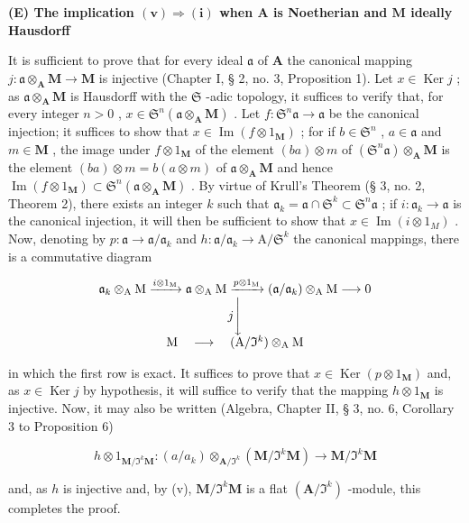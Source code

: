 \textbf{(E) The implication \((\mathbf{v})\Rightarrow (\mathbf{i})\) when \(\mathbf{A}\) is Noetherian and \(\mathbf{M}\) ideally Hausdorff}\par

It is sufficient to prove that for every ideal \(\mathfrak{a}\) of \(\mathbf{A}\) the canonical mapping \(j\colon \mathfrak{a} \otimes_{\mathbf{A}} \mathbf{M} \to \mathbf{M}\) is injective (Chapter I, § 2, no. 3, Proposition 1). Let \(x \in \operatorname{Ker} j\) ; as \(\mathfrak{a} \otimes_{\mathbf{A}} \mathbf{M}\) is Hausdorff with the \(\mathfrak{S}\) -adic topology, it suffices to verify that, for every integer \(n > 0\) , \(x \in \mathfrak{S}^n(\mathfrak{a} \otimes_{\mathbf{A}} \mathbf{M})\) . Let \(f\colon \mathfrak{S}^n\mathfrak{a} \to \mathfrak{a}\) be the canonical injection; it suffices to show that \(x \in \operatorname{Im}(f \otimes 1_{\mathbf{M}})\) ; for if \(b \in \mathfrak{S}^n\) , \(a \in \mathfrak{a}\) and \(m \in \mathbf{M}\) , the image under \(f \otimes 1_{\mathbf{M}}\) of the element \((ba) \otimes m\) of \((\mathfrak{S}^n\mathfrak{a}) \otimes_{\mathbf{A}} \mathbf{M}\) is the element \((ba) \otimes m = b(a \otimes m)\) of \(\mathfrak{a} \otimes_{\mathbf{A}} \mathbf{M}\) and hence \(\operatorname{Im}(f \otimes 1_{\mathbf{M}}) \subset \mathfrak{S}^n(\mathfrak{a} \otimes_{\mathbf{A}} \mathbf{M})\) . By virtue of Krull's Theorem (§ 3, no. 2, Theorem 2), there exists an integer \(k\) such that \(\mathfrak{a}_k = \mathfrak{a} \cap \mathfrak{S}^k \subset \mathfrak{S}^n\mathfrak{a}\) ; if \(i: \mathfrak{a}_k \to \mathfrak{a}\) is the canonical injection, it will then be sufficient to show that \(x \in \operatorname{Im}(i \otimes 1_M)\) . Now, denoting by \(p: \mathfrak{a} \to \mathfrak{a}/\mathfrak{a}_k\) and \(h: \mathfrak{a}/\mathfrak{a}_k \to \mathrm{A}/\mathfrak{S}^k\) the canonical mappings, there is a commutative diagram

\[
\begin{array}{c} \mathfrak {a} _ {k} \otimes_ {\mathrm{A}} \mathrm{M} \xrightarrow {i \otimes 1 _ {\mathrm{M}}} \mathfrak {a} \otimes_ {\mathrm{A}} \mathrm{M} \xrightarrow {p \otimes 1 _ {\mathrm{M}}} (\mathfrak {a} / \mathfrak {a} _ {k}) \otimes_ {\mathrm{A}} \mathrm{M} \longrightarrow 0 \\ j \Biggl \downarrow \\ \mathrm{M} \quad \longrightarrow \quad (\mathrm{A} / \mathfrak {I} ^ {k}) \otimes_ {\mathrm{A}} \mathrm{M} \end{array}
\]

in which the first row is exact. It suffices to prove that \(x \in \operatorname{Ker}(p \otimes 1_{\mathbf{M}})\) and, as \(x \in \operatorname{Ker} j\) by hypothesis, it will suffice to verify that the mapping \(h \otimes 1_{\mathbf{M}}\) is injective. Now, it may also be written (Algebra, Chapter II, § 3, no. 6, Corollary 3 to Proposition 6)

\[
h \otimes 1 _ {\mathbf {M} / \Im^ {k} \mathbf {M}}: (a / a _ {k}) \otimes_ {\mathbf {A} / \Im^ {k}} (\mathbf {M} / \Im^ {k} \mathbf {M}) \rightarrow \mathbf {M} / \Im^ {k} \mathbf {M}
\]

and, as \(h\) is injective and, by (v), \(\mathbf{M} / \Im^k\mathbf{M}\) is a flat \((\mathbf{A} / \Im^k)\) -module, this completes the proof.

